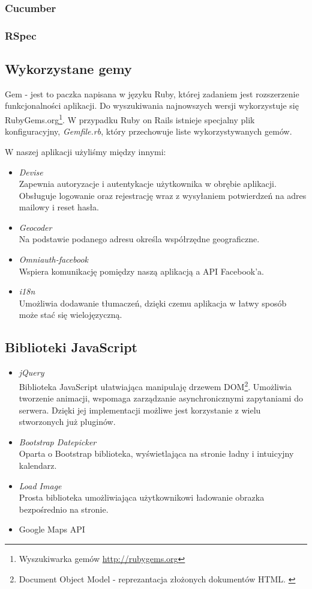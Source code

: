     \subsubsection{Cucumber}
    \subsubsection{RSpec}
  \subsection{Wykorzystane gemy}
    Gem - jest to paczka napisana w języku Ruby, której zadaniem jest rozszerzenie funkcjonalności aplikacji. Do wyszukiwania najnowszych wersji wykorzystuje się RubyGems.org\footnote{Wyszukiwarka gemów \url{http://rubygems.org}}. W przypadku Ruby on Rails istnieje specjalny plik konfiguracyjny, \emph{Gemfile.rb}, który przechowuje liste wykorzystywanych gemów.

    W naszej aplikacji użyliśmy między innymi:
    \begin{itemize}
      \item \emph{Devise} \\ Zapewnia autoryzacje i autentykacje użytkownika w obrębie aplikacji. Obsługuje logowanie oraz rejestrację wraz z wysyłaniem potwierdzeń na adres mailowy i reset hasła.
      \item \emph{Geocoder} \\ Na podstawie podanego adresu określa współrzędne geograficzne.
      \item \emph{Omniauth-facebook} \\ Wspiera komunikację pomiędzy naszą aplikacją a API Facebook'a.
      \item \emph{i18n} \\ Umożliwia dodawanie tłumaczeń, dzięki czemu aplikacja w łatwy sposób może stać się wielojęzyczną.
    \end{itemize}
  \subsection{Biblioteki JavaScript}
    \begin{itemize}
      \item \emph{jQuery} \\ Biblioteka JavaScript ułatwiająca manipulaję drzewem DOM\footnote{Document Object Model - reprezantacja złożonych dokumentów HTML. \cite{html5_css3}}. Umożliwia tworzenie animacji, wspomaga zarządzanie asynchronicznymi zapytaniami do serwera. Dzięki jej implementacji możliwe jest korzystanie z wielu stworzonych już pluginów.
      \item \emph{Bootstrap Datepicker} \\ Oparta o Bootstrap biblioteka, wyświetlająca na stronie ładny i intuicyjny kalendarz.
      \item \emph{Load Image} \\ Prosta biblioteka umożliwiająca użytkownikowi ładowanie obrazka bezpośrednio na stronie.
      \item Google Maps API
    \end{itemize}
